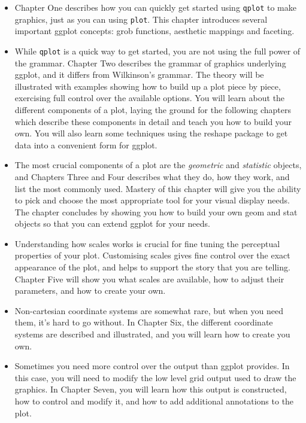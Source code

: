 \documentclass[oneside,letterpaper]{scrartcl}
\begin{document}
\begin{itemize}
	\item Chapter One describes how you can quickly get started using {\tt qplot} to make graphics, just as you can using {\tt plot}.  This chapter introduces several important ggplot concepts: grob functions, aesthetic mappings and faceting.
	
	\item While {\tt qplot} is a quick way to get started, you are not using the full power of the grammar.  Chapter Two describes the grammar of graphics underlying ggplot, and it differs from Wilkinson's grammar.  The theory will be illustrated with examples showing how to build up a plot piece by piece, exercising full control over the available options.  You will learn about the different components of a plot, laying the ground for the following chapters which describe these components in detail and teach you how to build your own.  You will also learn some techniques using the reshape package to get data into a convenient form for ggplot.

	\item The most crucial components of a plot are the {\em geometric} and {\em statistic} objects, and Chapters Three and Four describes what they do, how they work, and list the most commonly used.  Mastery of this chapter will give you the ability to pick and choose the most appropriate tool for your visual display needs.  The chapter concludes by showing you how to build your own geom and stat objects so that you can extend ggplot for your needs.

	\item Understanding how scales works is crucial for fine tuning the perceptual properties of your plot.  Customising scales gives fine control over the exact appearance of the plot, and helps to support the story that you are telling.  Chapter Five will show you what scales are available, how to adjust their parameters, and how to create your own.

	\item Non-cartesian coordinate systems are somewhat rare, but when you need them, it's hard to go without.  In Chapter Six, the different coordinate systems are described and illustrated, and you will learn how to create you own.
	
	\item Sometimes you need more control over the output than ggplot provides.  In this case, you will need to modify the low level grid output used to draw the graphics.  In Chapter Seven, you will learn how this output is constructed, how to control and modify it, and how to add additional annotations to the plot.

\end{itemize}
\end{document}
